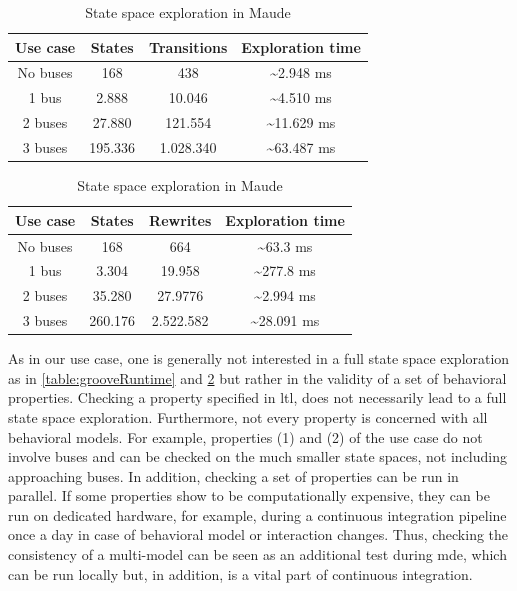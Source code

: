 \documentclass{jot}
\begin{document}
\begin{table}[ht]
\centering

\begin{tabular}{|c || c | c | c |}
 \hline
 Use case & States & Transitions & Exploration time \\
 \hline\hline
 No buses & 168 & 438 & \textasciitilde 2.948 ms \\
 \hline
 1 bus & 2.888 & 10.046 & \textasciitilde 4.510 ms \\
 \hline
 2 buses & 27.880 & 121.554 & \textasciitilde 11.629 ms \\
 \hline
 3 buses & 195.336 & 1.028.340 & \textasciitilde 63.487 ms \\
 \hline
\end{tabular}
\caption[State space exploration in Groove]{State space exploration in Groove}
\label{table:grooveRuntime}

\smallskip

\begin{tabular}{|c || c | c | c |}
 \hline
 Use case & States & Rewrites & Exploration time \\
 \hline\hline
 No buses & 168 & 664 & \textasciitilde 63.3 ms \\
 \hline
 1 bus & 3.304 & 19.958 & \textasciitilde 277.8 ms \\
 \hline
 2 buses & 35.280 & 27.9776 & \textasciitilde 2.994 ms \\
 \hline
 3 buses & 260.176 & 2.522.582 & \textasciitilde 28.091 ms \\
 \hline
\end{tabular}
\caption[State space exploration in Maude]{State space exploration in Maude}
\label{table:maudeRuntime}

\end{table}

As in our use case, one is generally not interested in a full state space exploration as in \cref{table:grooveRuntime} and \cref{table:maudeRuntime} but rather in the validity of a set of behavioral properties.
Checking a property specified in \gls*{ltl}, does not necessarily lead to a full state space exploration.
Furthermore, not every property is concerned with all behavioral models.
For example, properties (1) and (2) of the use case do not involve buses and can be checked on the much smaller state spaces, not including approaching buses.
In addition, checking a set of properties can be run in parallel.
If some properties show to be computationally expensive, they can be run on dedicated hardware, for example, during a continuous integration pipeline once a day in case of behavioral model or interaction changes.
Thus, checking the consistency of a multi-model can be seen as an additional test during \gls*{mde}, which can be run locally but, in addition, is a vital part of continuous integration.
\end{document}
